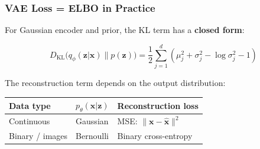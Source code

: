 \documentclass[aspectratio=169]{beamer}
\begin{document}
\begin{frame}
\frametitle{VAE Loss = ELBO in Practice}

\small
For Gaussian encoder and prior, the KL term has a \textbf{closed form}:

$$D_{\text{KL}}\!\big(q_\phi(\mathbf{z}|\mathbf{x}) \| p(\mathbf{z})\big) = \frac{1}{2}\sum_{j=1}^d \left(\mu_j^2 + \sigma_j^2 - \log\sigma_j^2 - 1\right)$$

\vspace{0.1cm}
The reconstruction term depends on the output distribution:

\vspace{0.1cm}
\begin{center}
\renewcommand{\arraystretch}{1.5}
\begin{tabular}{lll}
  \textbf{Data type} & \textbf{$p_\theta(\mathbf{x}|\mathbf{z})$} & \textbf{Reconstruction loss} \\
  \hline
  Continuous & Gaussian & MSE: $\|\mathbf{x} - \hat{\mathbf{x}}\|^2$ \\
  Binary / images & Bernoulli & Binary cross-entropy \\
  \hline
\end{tabular}
\end{center}

\vspace{0.15cm}
\begin{center}
\end{center}
\end{frame}
\end{document}
